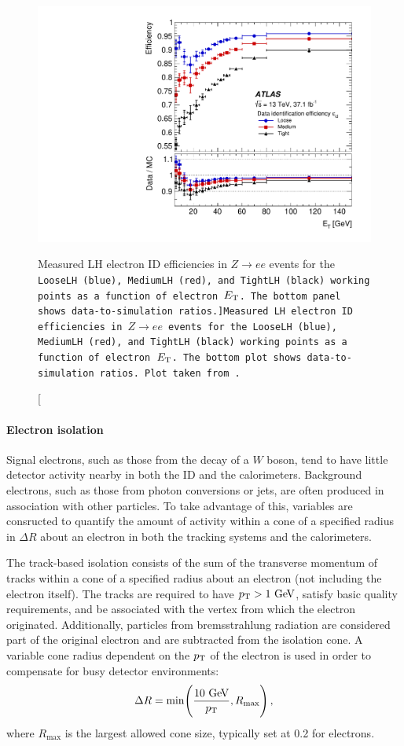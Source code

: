 \begin{figure}[htbp]
  \centering
  \includegraphics[width=.6\textwidth]{figs/detector/electron_id_efficiency}
  \caption[Measured LH electron ID efficiencies in $Z\rightarrow ee$ events for the \tt{LooseLH} (blue), \tt{MediumLH} (red), and \tt{TightLH} (black) working points as a function of electron $E_{\mathrm{T}}$. The bottom panel shows data-to-simulation ratios.]{Measured LH electron ID efficiencies in $Z\rightarrow ee$ events for the \tt{LooseLH} (blue), \tt{MediumLH} (red), and \tt{TightLH} (black) working points as a function of electron $E_{\mathrm{T}}$. The bottom plot shows data-to-simulation ratios. Plot taken from~\cite{2019.electron-reco-id}.}
  \label{fig:electron_id_efficiency}
\end{figure}

\paragraph*{Electron isolation}
Signal electrons, such as those from the decay of a $W$ boson, tend to have little detector activity nearby in both the ID and the calorimeters.
Background electrons, such as those from photon conversions or jets, are often produced in association with other particles.
To take advantage of this, variables are consructed to quantify the amount of activity within a cone of a specified radius in $\Delta R$ about an electron in both the tracking systems and the calorimeters.

The track-based isolation consists of the sum of the transverse momentum of tracks within a cone of a specified radius about an electron (not including the electron itself).
The tracks are required to have $\pt > 1\gev$, satisfy basic quality requirements, and be associated with the vertex from which the electron originated.
Additionally, particles from bremsstrahlung radiation are considered part of the original electron and are subtracted from the isolation cone.
A variable cone radius dependent on the $p_{\mathrm{T}}$ of the electron is used in order to compensate for busy detector environments:
\begin{equation}
  \Delta R = \mathrm{min}\Bigg(\frac{10\gev}{\pt},R_{\textrm{max}}\Bigg)\,,
  \label{eq:varcone}
\end{equation}
where $R_{\textrm{max}}$ is the largest allowed cone size, typically set at 0.2 for electrons.

